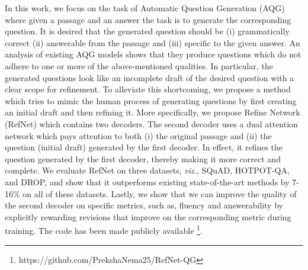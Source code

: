 In this work, we focus on the task of Automatic Question Generation (AQG) where given a passage and an answer the task is to generate the corresponding question. It is desired that the generated question should be (i) grammatically correct (ii) answerable from the passage and (iii) specific to the given answer. An analysis of existing AQG models shows that they produce questions which do not adhere to one or more of {the above-mentioned qualities}. In particular, the generated questions look like an incomplete draft of the desired question with a clear scope for refinement. {To alleviate this shortcoming}, we propose a method which tries to mimic the human process of generating questions by first creating an initial draft and then refining it. More specifically, we propose Refine Network (RefNet) which contains two decoders. The second decoder uses a dual attention network which pays attention to both (i) the original passage and (ii) the question (initial draft) generated by the first decoder. In effect, it refines the question generated by the first decoder, thereby making it more correct and complete. We evaluate RefNet on three datasets, \textit{viz.}, SQuAD, HOTPOT-QA, and DROP, and show that it outperforms existing state-of-the-art methods by 7-16\% on all of these datasets. Lastly, we show that we can improve the quality of the second decoder on specific metrics, such as, fluency and answerability by explicitly rewarding revisions that improve on the corresponding metric during training. The code has been made publicly available \footnote{https://github.com/PrekshaNema25/RefNet-QG}.